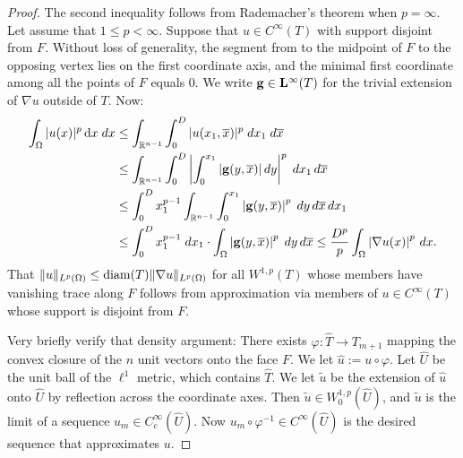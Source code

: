 \documentclass[10pt,letterpaper]{article}
\begin{document}
\begin{proof}
    The second inequality follows from Rademacher's theorem when $p = \infty$.
    Let assume that $1 \leq p < \infty$. 
    Suppose that $u \in C^{\infty}(T)$ with support disjoint from $F$.
    Without loss of generality, 
    the segment from to the midpoint of $F$ to the opposing vertex lies on the first coordinate axis,
    and the minimal first coordinate among all the points of $F$ equals $0$. 
    We write ${\mathbf g} \in {\mathbf L}^{\infty}(T)$ for the trivial extension of $\nabla u$ outside of $T$.
    Now:
    \begin{align*}
        \int_{\Omega} |u(x)|^{p} \mathop{}\!\mathrm{d} x \;dx
        &\leq
        \int_{{\mathbb R}^{n-1}} \int_{0}^{D} |u( x_{1}, \overline x )|^{p} \;dx_{1} \;d\overline{x}
        \\&
        \leq
        \int_{{\mathbb R}^{n-1}} \int_{0}^{D} \left| \int_{0}^{x_{1}} |{\mathbf g}( y, \overline x )| \,dy \right|^{p} \;dx_{1} \,d\overline{x}
        \\&
        \leq
        \int_{0}^{D} x_{1}^{p-1} \int_{{\mathbb R}^{n-1}} \int_{0}^{x_{1}} \left| {\mathbf g}( y, \overline x ) \right|^{p} \;dy \,d\overline{x} \,dx_{1}
        \\&
        \leq
        \int_{0}^{D} x_{1}^{p-1} \;dx_1 
        \cdot 
        \int_{\Omega} \left| {\mathbf g}( y, \overline x ) \right|^{p} \;dy \,d\overline{x} 
        \leq
        \frac{D^{p}}{p} \int_{\Omega} \left| \nabla u( x ) \right|^{p} \,dx
        .
    \end{align*}
    That $\|u\|_{L^{p}(\Omega)} \leq {\operatorname{diam}}(T) \|\nabla u\|_{L^{p}(\Omega)}$ for all $W^{1,p}(T)$ whose members have vanishing trace along $F$ follows from approximation via members of $u \in C^{\infty}(T)$ whose support is disjoint from $F$. 
    
    Very briefly verify that density argument: 
    There exists $\varphi : \hat T \rightarrow T_{m+1}$ mapping the convex closure of the $n$ unit vectors onto the face $F$.
    We let $\hat u := u \circ \varphi$.
    Let $\hat U$ be the unit ball of the $\ell^1$ metric, which contains $\hat T$.
    We let $\tilde u$ be the extension of $\hat u$ onto $\hat U$ by reflection across the coordinate axes.
    Then $\tilde u \in W^{1,p}_{0}(\hat U)$, and $\tilde u$ is the limit of a sequence $u_{m} \in C^{\infty}_{c}(\hat U)$.
    Now $u_{m} \circ \varphi^{-1} \in C^{\infty}(\hat U)$ is the desired sequence that approximates $u$. 
\end{proof}
\end{document}
